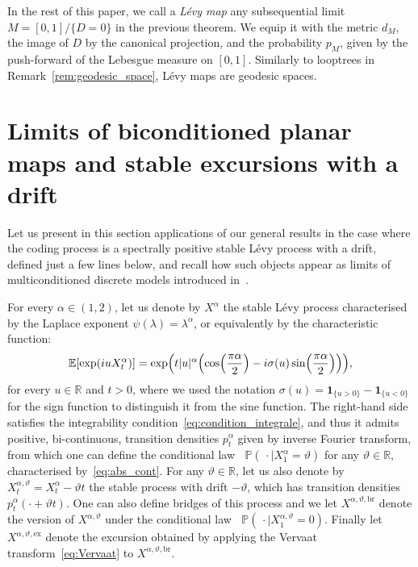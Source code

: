 \documentclass[british, a4paper,11pt]{article}
\numberwithin{equation}{section}
\theoremstyle{definition}
\renewcommand{\P}{\mathop{}\!\mathbb{P}}
\newcommand{\E}{\mathop{}\!\mathbb{E}}
\newcommand{\R}{\mathbb{R}}
\newcommand{\Map}{M}
\newcommand{\ind}[1]{\mathbf{1}_{\{#1\}}}
\newcommand{\exc}{\mathrm{ex}}
\newcommand{\br}{\mathrm{br}}
\begin{document}
In the rest of this paper, we call a \emph{L\'evy map} any subsequential limit $\Map = [0,1]/\{D=0\}$ in the previous theorem. 
We equip it with the metric $d_\Map$, the image of $D$ by the canonical projection, and the probability $p_\Map$, given by the push-forward of the Lebesgue measure on $[0,1]$. 
Similarly to looptrees in Remark~\ref{rem:geodesic_space}, L\'evy maps are geodesic spaces.



\section{Limits of biconditioned planar maps and  stable excursions with a drift}

\label{sec:biconditionnement}


Let us present in this section applications of our general results in the case where the coding process is a spectrally positive stable L\'evy process with a drift, defined just a few lines below, and recall how such objects appear as limits of multiconditioned discrete models introduced in~\cite{KM23}.




For every $\alpha \in (1,2)$, let us denote by $X^{\alpha}$ the stable L\'evy process characterised by the Laplace exponent $\psi(\lambda) = \lambda^\alpha$, or equivalently by the characteristic function:
\begin{equation}\label{eq:characteristic_stable}
\E[\exp(i u X^\alpha_t)] 
= \exp\Bigl(t |u|^\alpha \Bigl(\cos\Bigl(\frac{\pi \alpha}{2}\Bigr) - i \sigma(u) \sin\Bigl(\frac{\pi \alpha}{2}\Bigr)\Bigr)\Bigr)
,\end{equation}
for every $u \in \R$ and $t>0$, where we used the notation $\sigma(u) = \ind{u>0} - \ind{u<0}$ for the sign function to distinguish it from the sine function.
The right-hand side satisfies the integrability condition~\eqref{eq:condition_integrale}, and thus it admits positive, bi-continuous, transition densities $p^{\alpha}_t$ given by inverse Fourier transform, from which one can define the conditional law $\P(\,\cdot \mid X^\alpha_1 = \vartheta)$ for any $\vartheta \in \R$, characterised by~\eqref{eq:abs_cont}. For any $\vartheta \in \R$, let us also denote by $X^{\alpha, \vartheta}_t = X^\alpha_t - \vartheta t$ the stable process with  drift $-\vartheta$, which has transition densities $p^{\alpha}_t(\cdot + \vartheta t)$.
One can also define bridges of this process and we let $X^{\alpha, \vartheta, \br}$ denote the version of $X^{\alpha, \vartheta}$ under the conditional law $\P(\, \cdot \mid X^{\alpha,\vartheta}_1=0)$.
Finally let $X^{\alpha, \vartheta, \exc}$ denote the excursion obtained by applying the Vervaat transform~\eqref{eq:Vervaat} to $X^{\alpha, \vartheta, \br}$.
\end{document}
